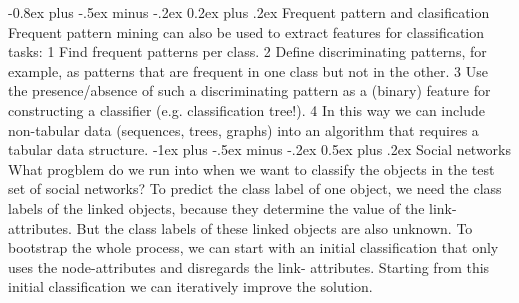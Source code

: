 \documentclass[8pt,landscape]{extarticle}
\makeatletter
\renewcommand{\section}{\@startsection{section}{1}{0mm}%
                                {-1ex plus -.5ex minus -.2ex}%
                                {0.5ex plus .2ex}%
                                {\normalfont\large\bfseries}}
\renewcommand{\subsection}{\@startsection{subsection}{2}{0mm}%
                                {-0.8ex plus -.5ex minus -.2ex}%
                                {0.2ex plus .2ex}%
                                {\normalfont\normalsize\bfseries}}
\makeatother
\begin{document}
\begin{multicols}{3}
\subsection{Frequent pattern and clasification}
Frequent pattern mining can also be used to extract features for classification
tasks: 1 Find frequent patterns per class.
2 Define discriminating patterns, for example,
as patterns that are frequent in one class but not in the other.
3 Use the presence/absence of such a discriminating pattern as a (binary)
feature for constructing a classifier (e.g. classification tree!).
4 In this way we can include non-tabular data (sequences, trees, graphs)
into an algorithm that requires a tabular data structure.
\section{Social networks}
What progblem do we run into when we want to classify the objects in the test
set of social networks?
To predict the class label of one object,
we need the class labels of the linked objects,
because they determine the value of the link-attributes.
But the class labels of these linked objects are also unknown.
To bootstrap the whole process, we can start with
an initial classification that only uses the node-attributes and disregards the
link- attributes.
Starting from this initial classification we can iteratively improve
the solution.
\end{multicols}
\end{document}
